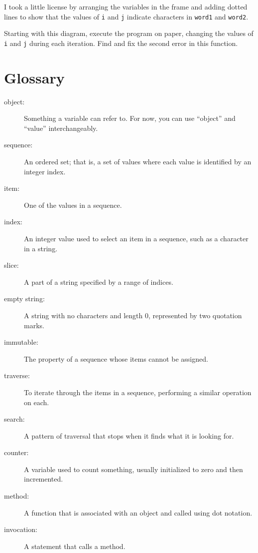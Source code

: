\documentclass[10pt]{book}
\begin{document}
I took a little license by arranging the variables in the frame
and adding dotted lines to show that the values of {\tt i} and
{\tt j} indicate characters in {\tt word1} and {\tt word2}.

\begin{exercise}
\label{isreverse}

Starting with this diagram, execute the program on paper, changing the
values of {\tt i} and {\tt j} during each iteration.  Find and fix the
second error in this function.

\end{exercise}



\section{Glossary}

\begin{description}

\item[object:] Something a variable can refer to.  For now,
you can use ``object'' and ``value'' interchangeably.

\item[sequence:] An ordered set; that is, a set of
values where each value is identified by an integer index.

\item[item:] One of the values in a sequence.

\item[index:] An integer value used to select an item in
a sequence, such as a character in a string.

\item[slice:] A part of a string specified by a range of indices.

\item[empty string:] A string with no characters and length 0, represented
by two quotation marks.

\item[immutable:] The property of a sequence whose items cannot
be assigned.

\item[traverse:] To iterate through the items in a sequence,
performing a similar operation on each.

\item[search:] A pattern of traversal that stops
when it finds what it is looking for.

\item[counter:] A variable used to count something, usually initialized
to zero and then incremented.

\item[method:] A function that is associated with an object and called
using dot notation.

\item[invocation:] A statement that calls a method.

\end{description}
\end{document}

